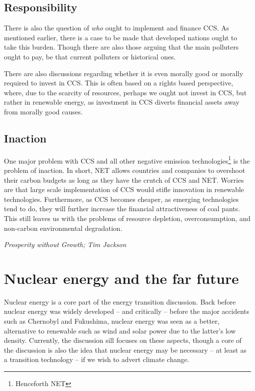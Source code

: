 \documentclass[12pt]{report}
\begin{document}
\section{Responsibility}

There is also the question of \emph{who} ought to implement and finance CCS. As
mentioned earlier, there is a case to be made that developed nations ought to
take this burden. Though there are also those arguing that the main polluters
ought to pay, be that current polluters or historical ones.

There are also discussions regarding whether it is even morally good or morally
required to invest in CCS. This is often based on a rights based perspective,
where, due to the scarcity of resources, perhaps we ought not invest in CCS, but
rather in renewable energy, as investment in CCS diverts financial assets away
from morally good causes.

\section{Inaction}

One major problem with CCS and all other negative emission
technologies\footnote{Henceforth NET} is the problem of inaction. In short, NET
allows countries and companies to overshoot their carbon budgets as long as they
have the crutch of CCS and NET. Worries are that large scale implementation of
CCS would stifle innovation in renewable technologies. Furthermore, as CCS
becomes cheaper, as emerging technologies tend to do, they will further increase
the financial attractiveness of coal pants. This still leaves us with the
problems of resource depletion, overconsumption, and non-carbon environmental
degradation.

\textit{Prosperity without Growth; Tim Jackson}

\chapter{Nuclear energy and the far future}

Nuclear energy is a core part of the energy transition discussion. Back before
nuclear energy was widely developed -- and critically -- before the major
accidents such as Chernobyl and Fukushima, nuclear energy was seen as a better,
alternative to renewable such as wind and solar power due to the latter's low
density. Currently, the discussion sill focuses on these aspects, though a core
of the discussion is also the idea that nuclear energy may be necessary -- at
least as a transition technology -- if we wish to advert climate change.
\end{document}
